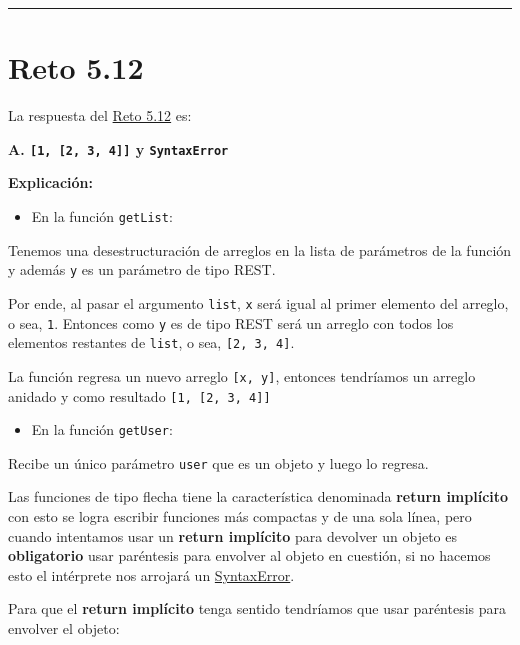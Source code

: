 \documentclass[
  letterpaper,
  DIV=11,
  numbers=noendperiod]{scrreprt}
\providecommand{\tightlist}{%
  \setlength{\itemsep}{0pt}\setlength{\parskip}{0pt}}
\begin{document}
\begin{center}\rule{0.5\linewidth}{0.5pt}\end{center}

\section{Reto 5.12}\label{sec-sol-cap5-reto12}

La respuesta del \hyperref[sec-cap5-reto12]{Reto 5.12} es:

\textbf{A. \texttt{{[}1,\ {[}2,\ 3,\ 4{]}{]}} y \texttt{SyntaxError}}

\textbf{Explicación:}

\begin{itemize}
\tightlist
\item
  En la función \texttt{getList}:
\end{itemize}

Tenemos una desestructuración de arreglos en la lista de parámetros de
la función y además \texttt{y} es un parámetro de tipo REST.

Por ende, al pasar el argumento \texttt{list}, \texttt{x} será igual al
primer elemento del arreglo, o sea, \texttt{1}. Entonces como \texttt{y}
es de tipo REST será un arreglo con todos los elementos restantes de
\texttt{list}, o sea, \texttt{{[}2,\ 3,\ 4{]}}.

La función regresa un nuevo arreglo \texttt{{[}x,\ y{]}}, entonces
tendríamos un arreglo anidado y como resultado
\texttt{{[}1,\ {[}2,\ 3,\ 4{]}{]}}

\begin{itemize}
\tightlist
\item
  En la función \texttt{getUser}:
\end{itemize}

Recibe un único parámetro \texttt{user} que es un objeto y luego lo
regresa.

Las funciones de tipo flecha tiene la característica denominada
\textbf{return implícito} con esto se logra escribir funciones más
compactas y de una sola línea, pero cuando intentamos usar un
\textbf{return implícito} para devolver un objeto es
\textbf{obligatorio} usar paréntesis para envolver al objeto en
cuestión, si no hacemos esto el intérprete nos arrojará un
\hyperref[glos-syntaxerror]{SyntaxError}.

Para que el \textbf{return implícito} tenga sentido tendríamos que usar
paréntesis para envolver el objeto:
\end{document}

